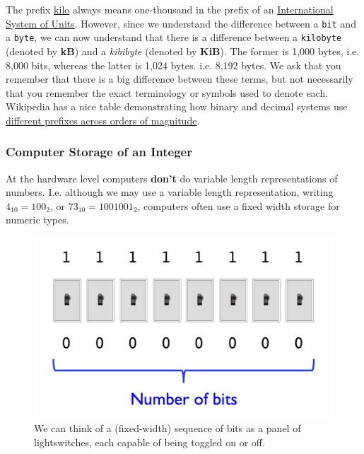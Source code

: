 \documentclass[12pt,letterpaper,twoside]{article}
\begin{document}
The prefix
\href{https://en.wikipedia.org/wiki/Kilobyte#Definitions_and_usage}{kilo}
always means one-thousand in the prefix of an
\href{https://en.wikipedia.org/wiki/International_System_of_Units#Prefixes}{International
  System of Units}. However, since we understand the difference
between a \texttt{bit} and a \texttt{byte}, we can now understand that
there is a difference between a \texttt{kilobyte} (denoted by \textbf{kB}) and
a \emph{kibibyte} (denoted by \textbf{KiB}). The former is 1,000 bytes, i.e. 8,000
bits, whereas the latter is 1,024 bytes. i.e. 8,192 bytes.
We ask that you remember that there is a big difference between these
terms, but not necessarily that you remember the exact terminology or
symbols used to denote each. Wikipedia has a nice table demonstrating
how binary and decimal systems use
\href{https://en.wikipedia.org/wiki/Orders_of_magnitude_(data)}{different prefixes across orders of magnitude}. 

\subsubsection{Computer Storage of an Integer}
At the hardware level computers \textbf{don't} do variable length
representations of numbers. I.e. although we may use a variable length
representation, writing $4_{10} = 100_2$, or $73_{10} = 1001001_2$,
computers often use a fixed width storage for numeric types.

\begin{figure}
\centering
\includegraphics[scale=0.35]{fig/bits.png}
\caption{\footnotesize We can think of a (fixed-width) sequence of bits as a panel
  of lightswitches, each capable of being toggled on or off. }
\end{figure}
\end{document}

